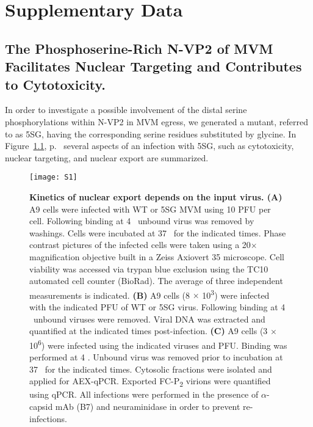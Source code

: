
\chapter{Supplementary Data} %

\label{Results} %


\section{The Phosphoserine-Rich N-VP2 of MVM Facilitates Nuclear Targeting and Contributes to Cytotoxicity.}
\label{Cytoskeleton}


\renewcommand{\thefigure}{S\arabic{figure}}
\setcounter{figure}{0}

In order to investigate a possible involvement of the distal serine phosphorylations within N-VP2 in MVM egress, we generated a mutant, referred to as 5SG, having the corresponding serine residues substituted by glycine. In Figure~\ref{S1}, p.~\pageref{S1} several aspects of an infection with 5SG, such as cytotoxicity, nuclear targeting, and nuclear export are summarized.

\begin{figure}
\centering
  \texttt{[image: S1]} \\[0.1cm]
  \caption[Kinetics of Nuclear Export Depends on the Input Virus]
   {\textbf{Kinetics of nuclear export depends on the input virus. (A)} A9 cells were infected with WT or 5SG MVM using 10 PFU per cell. Following binding at 4 \textcelsius~unbound virus was removed by washings. Cells were incubated at 37 \textcelsius~for the indicated times. Phase contrast pictures of the infected cells were taken using a 20$\times$ magnification objective built in a Zeiss Axiovert 35 microscope. Cell viability was accessed via trypan blue exclusion using the TC10\textsuperscript{\texttrademark} automated cell counter (BioRad). The average of three independent measurements is indicated. \textbf{(B)} A9 cells (8 $\times$ 10\textsuperscript{3}) were infected with the indicated PFU of WT or 5SG virus. Following binding at 4 \textcelsius~unbound viruses were removed. Viral DNA was extracted and quantified at the indicated times post-infection. \textbf{(C)} A9 cells (3 $\times$ 10\textsuperscript{6}) were infected using the indicated viruses and PFU. Binding was performed at 4 \textcelsius. Unbound virus was removed prior to incubation at 37 \textcelsius~for the indicated times. Cytosolic fractions were isolated and applied for AEX-qPCR. Exported FC-P\textsubscript{2} virions were quantified using qPCR. All infections were performed in the presence of $\alpha$-capsid mAb (B7) and neuraminidase in order to prevent re-infections.} 
\label{S1}
\end{figure}



